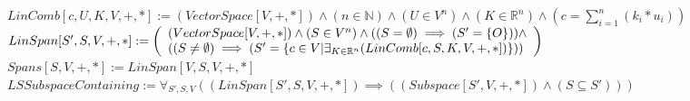 \documentclass{book}
\newcommand{\abr}{:=}
\begin{document}
$LinComb[c, U, K, V, +, *] \abr (VectorSpace[V, +, *]) \land (n \in \mathbb{N}) \land (U \in V^n) \land (K \in \mathbb{R}^n) \land (c = \sum_{i = 1}^{n}(k_i * u_i))$ \\
$LinSpan[S', S, V, +, *] \abr \left(\begin{array}{ll}
  (VectorSpace[V, +, *]) \land (S \in V^n) \land ((S = \emptyset) \implies (S' = \{O\})) \hfill \land \hfill \\
  ((S \neq \emptyset) \implies (S' = \{c \in V | \exists_{K \in \mathbb{R}^n}(LinComb[c, S, K, V, +, *])\}))
\end{array}\right)$ \\
$Spans[S, V, +, *] \abr LinSpan[V, S, V, +, *]$ \\

$LSSubspaceContaining \abr \forall_{S', S, V}((LinSpan[S', S, V, +, *]) \implies ((Subspace[S', V, +, *]) \land (S \subseteq S')))$
\end{document}
